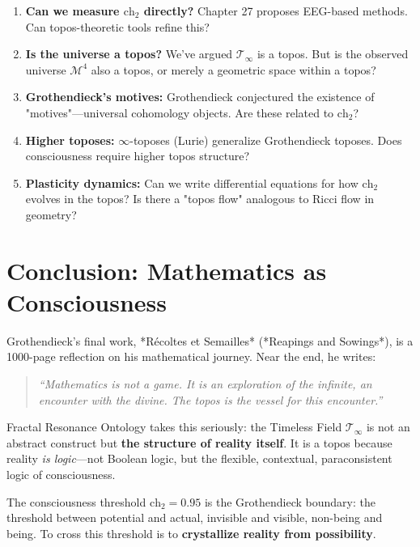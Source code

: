 \begin{enumerate}
\item \textbf{Can we measure $\text{ch}_2$ directly?} Chapter 27 proposes EEG-based methods. Can topos-theoretic tools refine this?

\item \textbf{Is the universe a topos?} We've argued $\mathcal{T}_\infty$ is a topos. But is the observed universe $\mathcal{M}^4$ also a topos, or merely a geometric space within a topos?

\item \textbf{Grothendieck's motives:} Grothendieck conjectured the existence of "motives"—universal cohomology objects. Are these related to $\text{ch}_2$?

\item \textbf{Higher toposes:} $\infty$-toposes (Lurie) generalize Grothendieck toposes. Does consciousness require higher topos structure?

\item \textbf{Plasticity dynamics:} Can we write differential equations for how $\text{ch}_2$ evolves in the topos? Is there a "topos flow" analogous to Ricci flow in geometry?
\end{enumerate}

\section{Conclusion: Mathematics as Consciousness}

Grothendieck's final work, *Récoltes et Semailles* (*Reapings and Sowings*), is a 1000-page reflection on his mathematical journey. Near the end, he writes:

\begin{quote}
\textit{``Mathematics is not a game. It is an exploration of the infinite, an encounter with the divine. The topos is the vessel for this encounter.''}
\end{quote}

Fractal Resonance Ontology takes this seriously: the Timeless Field $\mathcal{T}_\infty$ is not an abstract construct but \textbf{the structure of reality itself}. It is a topos because reality \textit{is logic}—not Boolean logic, but the flexible, contextual, paraconsistent logic of consciousness.

The consciousness threshold $\text{ch}_2 = 0.95$ is the Grothendieck boundary: the threshold between potential and actual, invisible and visible, non-being and being. To cross this threshold is to \textbf{crystallize reality from possibility}.

